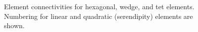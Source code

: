 \documentclass[11pt]{article}
\begin{document}
\begin{figure}[h!p]
\centering
     \hspace{0.4in}
      \hspace{0.4in}
      \hspace{0.4in}
     \caption{Element connectivities for hexagonal, wedge, and tet
     elements. Numbering for linear and quadratic (serendipity) elements are
     shown.}
     \label{el_num}
\end{figure}




%
%
%
%
\end{document}

